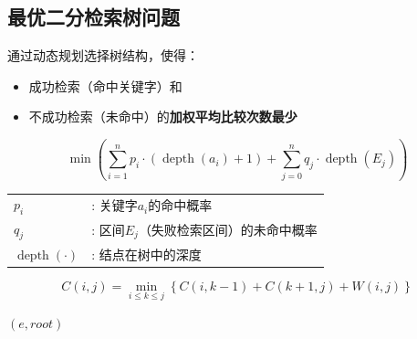 \documentclass[./../main.tex]{subfiles}
\begin{document}
\subsection{最优二分检索树问题}
通过动态规划选择树结构，使得：
\begin{itemize}
    \item 成功检索（命中关键字）和
    \item 不成功检索（未命中）的\textbf{加权平均比较次数最少}
\end{itemize}

\begin{equation*}
    \min \left( \sum_{i=1}^{n} p_i \cdot \left( \operatorname{depth}(a_i)+1 \right) + \sum_{j=0}^{n} q_j \cdot \operatorname{depth}(E_j) \right)
\end{equation*}

\begin{tabular}{ll}
    $p_i$ & : 关键字$a_i$的命中概率 \\
    $q_j$ & : 区间$E_j$（失败检索区间）的未命中概率 \\
    $\operatorname{depth}(\cdot)$ & : 结点在树中的深度 \\
\end{tabular}

\begin{equation*}
    C(i,j) = \min_{i \leq k \leq j} \left\{ C(i,k-1) + C(k+1,j) + W(i,j) \right\}
\end{equation*}

\begin{algorithm}[t]
    \BlankLine
    \Return $(e, root)$\;
    \caption{Optimal-BST}
\end{algorithm}
\end{document}
